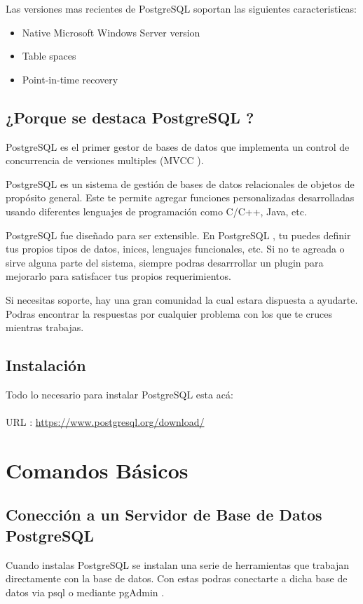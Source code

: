 \documentclass[10pt]{article}
\newcommand{\enlaces}[1]{{\textcolor{G}{URL} #1}}
\newcommand{\postgres}[1]{{\textcolor{R}{PostgreSQL} #1}}
\newcommand{\mvcc}[1]{{\textcolor{B}{MVCC} #1}}
\newcommand{\psql}[1]{{\textcolor{B}{psql} #1}}
\newcommand{\pgAdmin}[1]{{\textcolor{B}{pgAdmin} #1}}
\begin{document}
Las versiones mas recientes de \postgres{} soportan las siguientes caracteristicas:
\\
\begin{itemize}
\item Native Microsoft Windows Server version
\item Table spaces
\item Point-in-time recovery

\end{itemize}

\subsection{¿Porque se destaca \postgres{}?}
\postgres{} es el primer gestor de bases de datos que implementa  un control de concurrencia de versiones multiples (\mvcc{}). 

\postgres{} es un sistema de gestión de bases de datos relacionales de objetos de propósito general. Este te permite agregar funciones personalizadas desarrolladas usando diferentes  lenguajes de programación como C/C++, Java, etc.

\postgres{} fue diseñado para ser extensible. En \postgres{}, tu puedes definir tus propios tipos de datos, inices, lenguajes funcionales, etc. Si no te agreada o sirve alguna parte del sistema, siempre podras desarrrollar un plugin para mejorarlo para satisfacer tus propios requerimientos.

Si necesitas soporte, hay una gran comunidad la cual estara dispuesta a ayudarte. Podras encontrar la respuestas por cualquier problema con los que te cruces mientras trabajas.



\subsection{Instalación}
Todo lo necesario para instalar PostgreSQL esta acá:
\\ \\
\enlaces{} : \url{https://www.postgresql.org/download/}  


\section{Comandos Básicos}
\subsection{Conección a un Servidor de Base de Datos \postgres{}}
Cuando instalas \postgres{} se instalan una serie de herramientas que trabajan directamente con la base de datos. 
Con estas podras conectarte a dicha base de datos via \psql{}
o mediante \pgAdmin{}.
\end{document}
